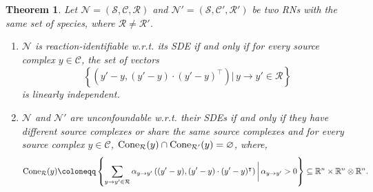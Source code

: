 \documentclass[10pt,a4paper]{amsart}
\let\emptyset\varnothing
\newtheorem{theorem}{Theorem}[section]
\theoremstyle{definition}
\theoremstyle{remark}
\theoremstyle{consequence}
\def\cN{\mathcal{N}}
\def\cR{\mathcal{R}}
\def\cS{\mathcal{S}}
\def\cC{\mathcal{C}}
\def\R{\mathbb{R}}
\numberwithin{equation}{section}
\begin{document}
\begin{theorem}\label{weak_react_id}
Let $\cN = (\cS, \cC, \cR)$ and $\cN' = (\cS, \cC', \cR')$ be two RNs with the same set of species, where $\cR \neq \cR'$.

\begin{enumerate}
\item $\cN$ is reaction-identifiable w.r.t. its SDE if and only if for every source complex $y\in \cC$, the set of vectors 
\begin{equation}\label{generalized_reaction_vectors}
    \left\{\left(y'-y,(y' - y)\cdot (y' - y)^{\intercal}\right) \big| \, y\to y'\in\cR\right\}
\end{equation}
is linearly independent.



\item $\cN$ and $\cN'$ are unconfoundable w.r.t. their SDEs if and only if they have different source complexes or share the same source complexes and for every source complex $y \in \cC$, ${\rm Cone}_\cR(y) \cap {\rm Cone}_{\cR'}(y) = \emptyset$,
where, 
\begin{align}\label{def_cone}
{\rm Cone}_\cR(y)\coloneqq \left\{\sum_{y\to y'\in \cR}\alpha_{y\to y'}\left((y' - y),(y' - y)\cdot(y' - y)^{\intercal}\right)\bigg|\, \alpha_{y\to y'}>0\right\} \subseteq \R^n \times \R^n \otimes \R^n.
\end{align}
\end{enumerate}

\end{theorem}
\end{document}
